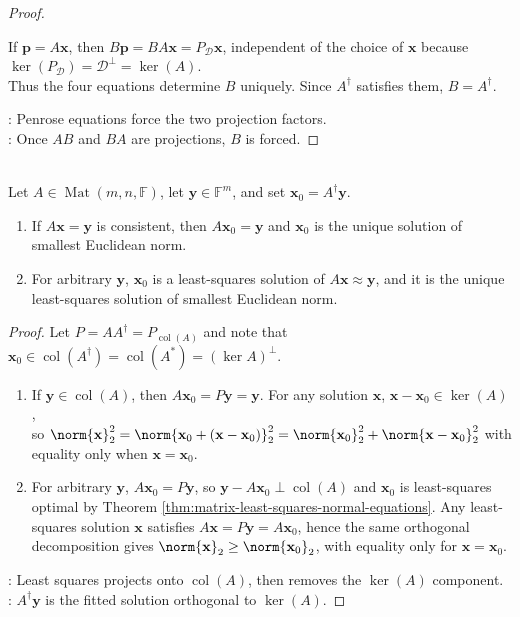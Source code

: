\begin{theorem}
\begin{proof}
\begin{enumerate}[label=(\roman*)]
If $\mathbf{p}=A\mathbf{x}$, then $B\mathbf{p}=BA\mathbf{x}=P_{\mathcal{D}}\mathbf{x}$, independent of the choice of $\mathbf{x}$ because $\ker(P_{\mathcal{D}})=\mathcal{D}^{\perp}=\ker(A)$.\\
Thus the four equations determine $B$ uniquely. Since $A^{\dagger}$ satisfies them, $B=A^{\dagger}$.
\end{enumerate}
: Penrose equations force the two projection factors.\\
: Once $AB$ and $BA$ are projections, $B$ is forced.
\end{proof}
\end{theorem}

\begin{theorem} \label{thm:pseudoinverse-minimum-norm-least-squares} \\
Let $A\in\operatorname{Mat}(m,n,\mathbb{F})$, let $\mathbf{y}\in\mathbb{F}^m$, and set $\mathbf{x}_0=A^{\dagger}\mathbf{y}$.
\begin{enumerate}[label=(\roman*)]
\setlength{\itemsep}{0pt}
\item If $A\mathbf{x}=\mathbf{y}$ is consistent, then $A\mathbf{x}_0=\mathbf{y}$ and $\mathbf{x}_0$ is the unique solution of smallest Euclidean norm.
\item For arbitrary $\mathbf{y}$, $\mathbf{x}_0$ is a least-squares solution of $A\mathbf{x}\approx\mathbf{y}$, and it is the unique least-squares solution of smallest Euclidean norm.
\end{enumerate}
\begin{proof}
Let $P=AA^{\dagger}=P_{\operatorname{col}(A)}$ and note that $\mathbf{x}_0\in\operatorname{col}(A^{\dagger})=\operatorname{col}(A^*)=(\ker A)^{\perp}$.
\begin{enumerate}[label=(\roman*)]
\setlength{\itemsep}{0pt}
\item If $\mathbf{y}\in\operatorname{col}(A)$, then $A\mathbf{x}_0=P\mathbf{y}=\mathbf{y}$. For any solution $\mathbf{x}$, $\mathbf{x}-\mathbf{x}_0\in\ker(A)$,\\
so $\norm{\mathbf{x}}_2^2 =\norm{\mathbf{x}_0+(\mathbf{x}-\mathbf{x}_0)}_2^2 =\norm{\mathbf{x}_0}_2^2+\norm{\mathbf{x}-\mathbf{x}_0}_2^2$ with equality only when $\mathbf{x}=\mathbf{x}_0$.
\item For arbitrary $\mathbf{y}$, $A\mathbf{x}_0=P\mathbf{y}$, so $\mathbf{y}-A\mathbf{x}_0\perp\operatorname{col}(A)$ and $\mathbf{x}_0$ is least-squares optimal by Theorem \ref{thm:matrix-least-squares-normal-equations}. Any least-squares solution $\mathbf{x}$ satisfies $A\mathbf{x}=P\mathbf{y}=A\mathbf{x}_0$, hence the same orthogonal decomposition gives $\norm{\mathbf{x}}_2\geq\norm{\mathbf{x}_0}_2$, with equality only for $\mathbf{x}=\mathbf{x}_0$.
\end{enumerate}
: Least squares projects onto $\operatorname{col}(A)$, then removes the $\ker(A)$ component.\\
: $A^{\dagger}\mathbf{y}$ is the fitted solution orthogonal to $\ker(A)$.
\end{proof}
\end{theorem}

